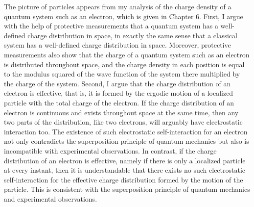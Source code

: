 The picture of particles appears from my analysis of the charge density of a quantum system such as an electron, which is given in Chapter 6.
First, I argue with the help of protective measurements that a quantum system has a well-defined charge distribution in space, in exactly the same sense that a classical system has a well-defined charge distribution in space. Moreover, protective measurements also show that the charge of a quantum system such as an electron is distributed throughout space, and the charge density in each position is equal to the modulus squared of the wave function of the system there multiplied by the charge of the system. 
Second, I argue that the charge distribution of an electron is effective, that is, it is formed by the ergodic motion of a localized particle with the total charge of the electron.
If the charge distribution of an electron is continuous and exists throughout space at the same time, then any two parts of the distribution, like two electrons, will arguably have electrostatic interaction too. The existence of such electrostatic self-interaction for an electron not only contradicts the superposition principle of quantum mechanics but also is incompatible with experimental observations. In contrast, if the charge distribution of an electron is effective, namely if there is only a localized particle at every instant, then it is understandable that there exists no such electrostatic self-interaction for the effective charge distribution formed by the motion of the particle. This is consistent with the superposition principle of quantum mechanics and experimental observations. 

